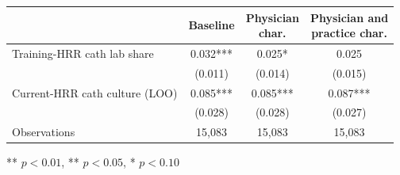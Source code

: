 \begin{threeparttable}
\begin{tabular}{lccc}
\toprule
 & Baseline & \shortstack{Physician\\char.} & \shortstack{Physician and\\practice char.} \\
\midrule
Training-HRR cath lab share & 0.032*** & 0.025* & 0.025 \\
 & (0.011) & (0.014) & (0.015) \\
Current-HRR cath culture (LOO) & 0.085*** & 0.085*** & 0.087*** \\
 & (0.028) & (0.028) & (0.027) \\
\midrule
Observations & 15,083 & 15,083 & 15,083 \\
\bottomrule
\end{tabular}
\begin{tablenotes}[flushleft]
\footnotesize
\item *** $p < 0.01$, ** $p < 0.05$, * $p < 0.10$
\end{tablenotes}
\end{threeparttable}
